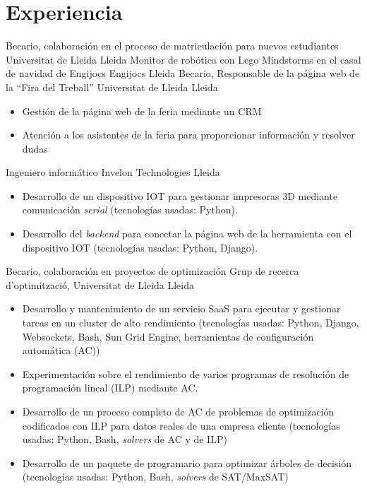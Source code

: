 \documentclass[a4paper,12pt,final]{moderncv}
\begin{document}
\section{Experiencia}
	{Becario, colaboración en el proceso de matriculación para nuevos estudiantes}
	{Universitat de Lleida}
	{Lleida}
	{}
	{}
	{Monitor de robótica con Lego Mindstorms en el casal de navidad de Engijocs}
	{Engijocs}
	{Lleida}
	{}
	{}
	{Becario, Responsable de la página web de la ``Fira del Treball''}
	{Universitat de Lleida}
	{Lleida}
	{}
	{\begin{itemize}
		\item Gestión de la página web de la feria mediante un CRM
		\item Atención a los asistentes de la feria para proporcionar información y resolver dudas
	\end{itemize}}
	{Ingeniero informático}
	{Invelon Technologies}
	{Lleida}
	{}
	{\begin{itemize}
		\item Desarrollo de un dispositivo IOT para gestionar impresoras 3D mediante
			comunicación \textit{serial} (tecnologías usadas: Python).
		\item Desarrollo del \textit{backend} para conectar la página web de la herramienta
			con el dispositivo IOT (tecnologías usadas: Python, Django).
	\end{itemize}}
	{Becario, colaboración en proyectos de optimización}
	{Grup de recerca d'optimització, Universitat de Lleida}
	{Lleida}
	{}
	{\begin{itemize}
		\item Desarrollo y mantenimiento de un servicio SaaS para ejecutar
			y gestionar tareas en un cluster de alto rendimiento (tecnologías
			usadas: Python, Django, Websockets, Bash, Sun Grid Engine,
			herramientas de configuración automática (AC))
		\item Experimentación sobre el rendimiento de varios programas de
			resolución de programación lineal (ILP) mediante AC.
		\item Desarrollo de un proceso completo de AC de problemas de optimización
			codificados con ILP para datos reales de una empresa cliente
			(tecnologías usadas: Python, Bash, \textit{solvers} de AC y de ILP)
		\item Desarrollo de un paquete de programario para optimizar árboles de
			decisión (tecnologías usadas: Python, Bash, \textit{solvers} de SAT/MaxSAT)
	\end{itemize}}
\end{document}

